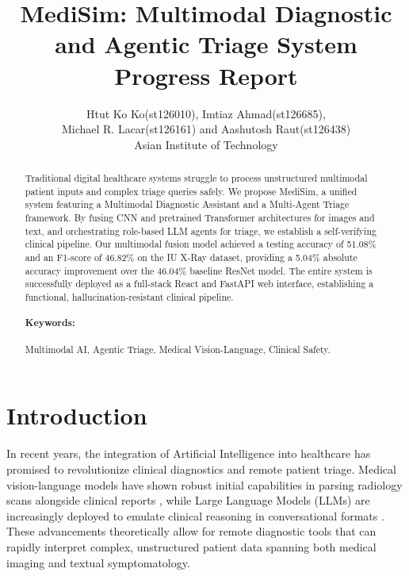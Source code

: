 \documentclass[11pt,a4paper]{article}
\title{MediSim: Multimodal Diagnostic and Agentic Triage System\\
Progress Report}
\author{
  \mdseries Htut Ko Ko(st126010), Imtiaz Ahmad(st126685), \\
  \mdseries Michael R. Lacar(st126161) and Aashutosh Raut(st126438) \\
  \mdseries Asian Institute of Technology
}
\begin{document}
\maketitle
\thispagestyle{plain}
\pagestyle{plain}

\begin{abstract}
Traditional digital healthcare systems struggle to process unstructured multimodal patient inputs and complex triage queries safely. We propose MediSim, a unified system featuring a Multimodal Diagnostic Assistant and a Multi-Agent Triage framework. By fusing CNN and pretrained Transformer architectures for images and text, and orchestrating role-based LLM agents for triage, we establish a self-verifying clinical pipeline. Our multimodal fusion model achieved a testing accuracy of 51.08\% and an F1-score of 46.82\% on the IU X-Ray dataset, providing a 5.04\% absolute accuracy improvement over the 46.04\% baseline ResNet model. The entire system is successfully deployed as a full-stack React and FastAPI web interface, establishing a functional, hallucination-resistant clinical pipeline.

\paragraph{Keywords:} Multimodal AI, Agentic Triage, Medical Vision-Language, Clinical Safety.
\end{abstract}

\section{Introduction}

In recent years, the integration of Artificial Intelligence into healthcare has promised to revolutionize clinical diagnostics and remote patient triage. Medical vision-language models have shown robust initial capabilities in parsing radiology scans alongside clinical reports \citep{bu2024dynamic}, while Large Language Models (LLMs) are increasingly deployed to emulate clinical reasoning in conversational formats \citep{lu2024triageagent}. These advancements theoretically allow for remote diagnostic tools that can rapidly interpret complex, unstructured patient data spanning both medical imaging and textual symptomatology.
\end{document}
